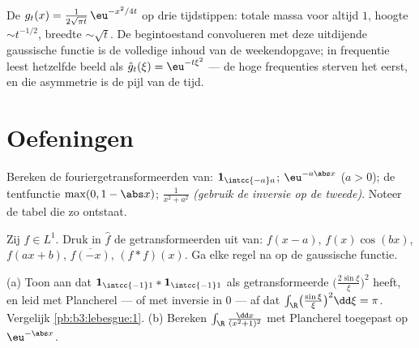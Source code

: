 \begin{omfigure}

{\small De  $g_t(x) = \frac1{2\sqrt{\pi
t}}\,\eu^{-x^2/4t}$ op drie tijdstippen: totale massa voor altijd
$1$, hoogte $\sim t^{-1/2}$, breedte $\sim \sqrt t$. De
begintoestand convolueren met deze uitdijende gaussische functie
is de volledige inhoud van de weekendopgave; in frequentie leest
hetzelfde beeld als $\hat g_t(\xi) = \eu^{-t\xi^2}$ --- de hoge
frequenties sterven het eerst, en die asymmetrie is de pijl van
de tijd.}
\end{omfigure}

\section{Oefeningen}

\begin{exercise}[$\star$]\label{exo:b3:fouriertransform:1}
Bereken de fouriergetransformeerden van: $\mathbf
1_{\intcc{-a}a}$; $\eu^{-a\abs x}$ ($a > 0$); de tentfunctie
$\max(0, 1 - \abs x)$; $\frac1{x^2 + a^2}$ \emph{(gebruik de
inversie op de tweede)}. Noteer de tabel die zo ontstaat.
\end{exercise}

\begin{exercise}[$\star$]\label{exo:b3:fouriertransform:2}
Zij $f \in L^1$. Druk in $\hat f$ de getransformeerden uit van:
$f(x - a)$, $f(x)\cos(bx)$, $f(ax + b)$, $\overline{f(-x)}$, $(f
* f)(x)$. Ga elke regel na op de gaussische functie.
\end{exercise}

\begin{exercise}[$\star\star$]\label{exo:b3:fouriertransform:3}
(a) Toon aan dat $\mathbf 1_{\intcc{-1}1} * \mathbf
1_{\intcc{-1}1}$ als getransformeerde $\bigl(\frac{2\sin\xi}\xi
\bigr)^2$ heeft, en leid met Plancherel ---
of met inversie in $0$ --- af dat
$\int_\R\bigl(\frac{\sin\xi}\xi\bigr)^2\dd\xi = \pi$. Vergelijk
\cref{pb:b3:lebesgue:1}.
(b) Bereken $\int_\R\frac{\dd x}{(x^2+1)^2}$ met Plancherel
toegepast op $\eu^{-\abs x}$.
\end{exercise}

